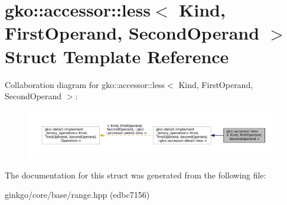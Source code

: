 \hypertarget{structgko_1_1accessor_1_1less}{}\section{gko\+:\+:accessor\+:\+:less$<$ Kind, First\+Operand, Second\+Operand $>$ Struct Template Reference}
\label{structgko_1_1accessor_1_1less}


Collaboration diagram for gko\+:\+:accessor\+:\+:less$<$ Kind, First\+Operand, Second\+Operand $>$\+:
\nopagebreak
\begin{figure}[H]
\begin{center}
\leavevmode
\includegraphics[width=350pt]{structgko_1_1accessor_1_1less__coll__graph}
\end{center}
\end{figure}


The documentation for this struct was generated from the following file\+:\begin{DoxyCompactItemize}
\item 
ginkgo/core/base/range.\+hpp (edbc7156)\end{DoxyCompactItemize}
